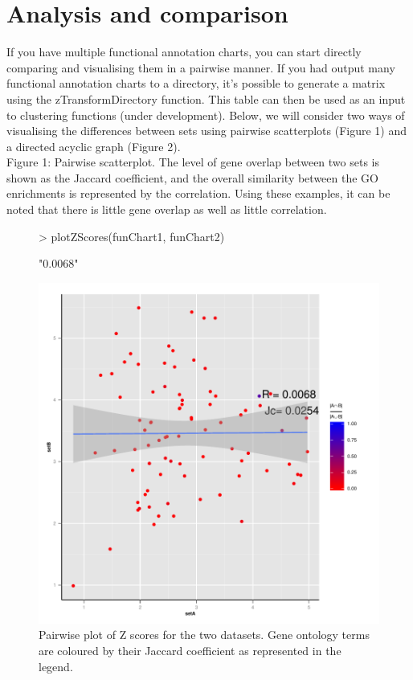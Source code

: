 \documentclass[11pt, oneside]{article}
\begin{document}
\section{Analysis and comparison}

If you have multiple functional annotation charts, you can start directly comparing and visualising them in a pairwise manner. If you had output many functional annotation charts to a directory, it's possible to generate a matrix using the zTransformDirectory function. This table can then be used as an input to clustering functions (under development). Below, we will consider two ways of visualising the differences between sets using pairwise scatterplots (Figure 1) and a directed acyclic graph (Figure 2).\\
Figure 1: Pairwise scatterplot. The level of gene overlap between two sets is shown as the Jaccard coefficient, and the overall similarity between the GO enrichments is represented by the correlation. Using these examples, it can be noted that there is little gene overlap as well as little correlation.\\
\begin{figure}
\begin{center}
\begin{Schunk}
\begin{Sinput}
> plotZScores(funChart1, funChart2)
\end{Sinput}
\begin{Soutput}
[1] "0.0068"
\end{Soutput}
\end{Schunk}
\includegraphics{CompGO-fig1}
\end{center}
\caption{Pairwise plot of Z scores for the two datasets. Gene ontology terms are coloured by their Jaccard coefficient as represented in the legend.}
\label{fig:one}
\end{figure}
\end{document}

